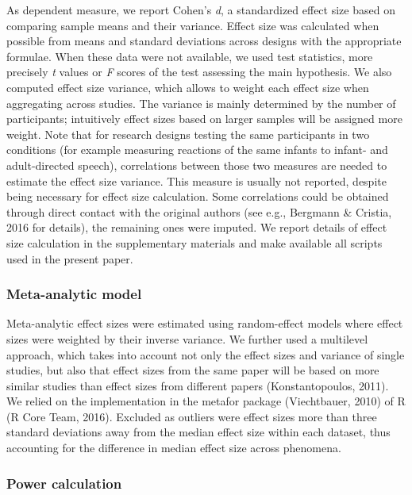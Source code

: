 \documentclass[english,floatsintext,man]{apa6}
\newcounter{author}
\begin{document}
As dependent measure, we report Cohen's \emph{d}, a standardized effect
size based on comparing sample means and their variance. Effect size was
calculated when possible from means and standard deviations across
designs with the appropriate formulae. When these data were not
available, we used test statistics, more precisely \emph{t} values or
\emph{F} scores of the test assessing the main hypothesis. We also
computed effect size variance, which allows to weight each effect size
when aggregating across studies. The variance is mainly determined by
the number of participants; intuitively effect sizes based on larger
samples will be assigned more weight. Note that for research designs
testing the same participants in two conditions (for example measuring
reactions of the same infants to infant- and adult-directed speech),
correlations between those two measures are needed to estimate the
effect size variance. This measure is usually not reported, despite
being necessary for effect size calculation. Some correlations could be
obtained through direct contact with the original authors (see e.g.,
Bergmann \& Cristia, 2016 for details), the remaining ones were imputed.
We report details of effect size calculation in the supplementary
materials and make available all scripts used in the present paper.

\subsubsection{Meta-analytic model}\label{meta-analytic-model}

Meta-analytic effect sizes were estimated using random-effect models
where effect sizes were weighted by their inverse variance. We further
used a multilevel approach, which takes into account not only the effect
sizes and variance of single studies, but also that effect sizes from
the same paper will be based on more similar studies than effect sizes
from different papers (Konstantopoulos, 2011). We relied on the
implementation in the metafor package (Viechtbauer, 2010) of R (R Core
Team, 2016). Excluded as outliers were effect sizes more than three
standard deviations away from the median effect size within each
dataset, thus accounting for the difference in median effect size across
phenomena.

\subsubsection{Power calculation}\label{power-calculation}
\end{document}

